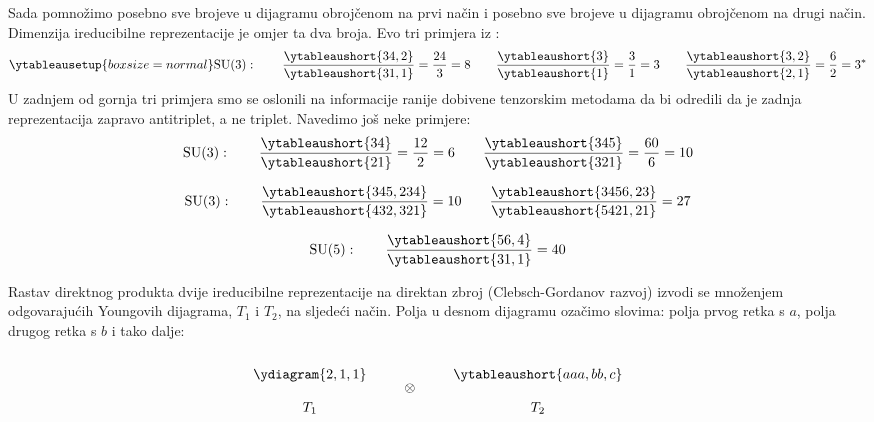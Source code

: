 Sada pomnožimo posebno sve brojeve u dijagramu obrojčenom na prvi način i
posebno sve brojeve u dijagramu obrojčenom na drugi način. Dimenzija
ireducibilne reprezentacije je omjer ta dva broja.
Evo tri primjera iz :
\begin{displaymath}
\ytableausetup{boxsize=normal}
\SU{3}: \qquad \frac{\ytableaushort{34,2}}{\ytableaushort{31,1}} = \frac{24}{3}= 8
\qquad
\frac{\ytableaushort{3}}{\ytableaushort{1}} = \frac{3}{1}= 3
\qquad
\frac{\ytableaushort{3,2}}{\ytableaushort{2,1}} = \frac{6}{2}= 3^*
\end{displaymath}
U zadnjem od gornja tri primjera smo se oslonili na informacije ranije dobivene
tenzorskim metodama da bi odredili da je zadnja reprezentacija zapravo
antitriplet, a ne triplet. Navedimo još neke primjere:
\begin{displaymath}
\SU{3}: \qquad \frac{\ytableaushort{34}}{\ytableaushort{21}} = \frac{12}{2}= 6
\qquad
\frac{\ytableaushort{345}}{\ytableaushort{321}} = \frac{60}{6}= 10
\end{displaymath}

\begin{displaymath}
\SU{3}: \qquad \frac{\ytableaushort{345,234}}{\ytableaushort{432,321}} = 10
 \qquad 
\frac{\ytableaushort{3456,23}}{\ytableaushort{5421,21}} = 27
\end{displaymath}

\begin{displaymath}
\SU{5}: \qquad \frac{\ytableaushort{56,4}}{\ytableaushort{31,1}} = 40
\end{displaymath}


Rastav direktnog produkta dvije  ireducibilne reprezentacije na direktan zbroj
(Clebsch-Gordanov razvoj) izvodi se množenjem odgovarajućih
Youngovih dijagrama, $T_1$ i $T_2$, na sljedeći način. Polja u desnom
dijagramu ozačimo slovima: polja prvog retka
s $a$, polja drugog retka s $b$ i tako dalje:

\begin{displaymath}
\renewcommand{\arraystretch}{2}
\begin{array}{c}
\ydiagram{2,1,1} \\ T_1
\end{array}
 \qquad \otimes \qquad 
\begin{array}{c}
\ytableaushort{aaa,bb,c} \\ T_2
\end{array}
\end{displaymath}

